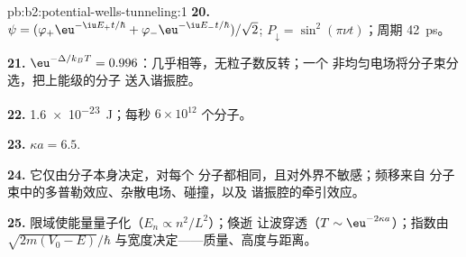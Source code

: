 \begin{solution}{pb:b2:potential-wells-tunneling:1}
\textbf{20.} $\psi = (\varphi_+\eu^{-\iu E_+t/\hbar} + \varphi_-\eu^{-\iu E_-t/\hbar})/\sqrt2$;
$P_{\downarrow} = \sin^2(\pi\nu t)$；周期 \qty{42}{ps}。

\textbf{21.} $\eu^{-\Delta/k_BT} = 0.996$：几乎相等，无粒子数反转；一个
非均匀电场将分子束分选，把上能级的分子
送入谐振腔。

\textbf{22.} \qty{1.6e-23}{J}；每秒 $6 \times 10^{12}$ 个分子。

\textbf{23.} $\kappa a = 6.5$.

\textbf{24.} 它仅由分子本身决定，对每个
分子都相同，且对外界不敏感；频移来自
分子束中的多普勒效应、杂散电场、碰撞，以及
谐振腔的牵引效应。

\textbf{25.} 限域使能量量子化（$E_n \propto n^2/L^2$）；倏逝
让波穿透（$T \sim \eu^{-2\kappa a}$）；指数由
$\sqrt{2m(V_0 - E)}/\hbar$ 与宽度决定——质量、高度与距离。
\end{solution}
